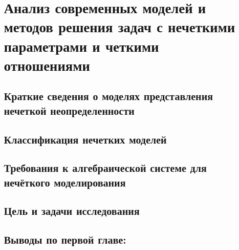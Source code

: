 \chapter{Анализ современных моделей и методов решения задач с нечеткими параметрами и четкими отношениями}
\label{chapter1}

\section{Краткие сведения о моделях представления нечеткой неопределенности}
\label{chapter1_1}


\section{Классификация нечетких моделей} 
\label{chapter1_2}


\section{Требования к алгебраической системе для нечёткого моделирования} 
\label{chapter1_3}


\section{Цель и задачи исследования} 
\label{chapter1_4}


\section*{Выводы по первой главе:}
\label{chapter1_5}
